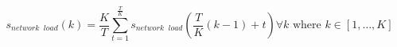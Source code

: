 \begin{equation}
	s_{network\;\;load}(k) = \frac{K}{T}\sum_{t=1}^{\frac{T}{K}}s_{network\;\;load}\left(\frac{T}{K}(k-1) + t\right) \forall k \text{ where } k \in [1, \dots, K]
	\label{ch1:equ:down-sampling-to-half-hourly}
\end{equation}